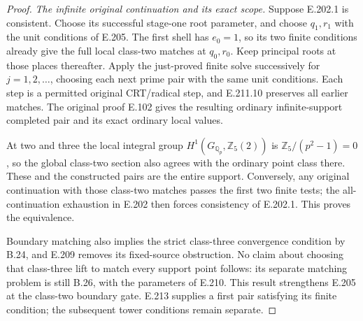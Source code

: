 \begin{proof}
\emph{The infinite original continuation and its exact scope.}
Suppose E.202.1 is consistent. Choose its successful stage-one
root parameter, and choose $q_1,r_1$ with the unit conditions
of E.205. The first shell has $e_0=1$, so its two finite
conditions already give the full local class-two matches
at $q_0,r_0$. Keep principal roots at those places thereafter.
Apply the just-proved finite solve successively for $j=1,2,\ldots$,
choosing each next prime pair with the same unit conditions.
Each step is a permitted original CRT/radical step, and
E.211.10 preserves all earlier matches. The original proof
E.102 gives the resulting ordinary infinite-support completed
pair and its exact ordinary local values.

At two and three the local integral group
$H^1(G_{\mathbb Q_p},\mathbb Z_5(2))$
is $\mathbb Z_5/(p^2-1)=0$, so the global class-two section
also agrees with the ordinary point class there. These
and the constructed pairs are the entire support.
Conversely, any original continuation with those class-two
matches passes the first two finite tests; the all-continuation
exhaustion in E.202 then forces consistency of E.202.1.
This proves the equivalence.

Boundary matching also implies the strict class-three
convergence condition by B.24, and E.209 removes its
fixed-source obstruction. No claim about choosing that
class-three lift to match every support point follows:
its separate matching problem is still B.26, with the
parameters of E.210. This result strengthens E.205 at the
class-two boundary gate. E.213 supplies a first pair satisfying
its finite condition; the subsequent tower conditions remain
separate.
\end{proof}
